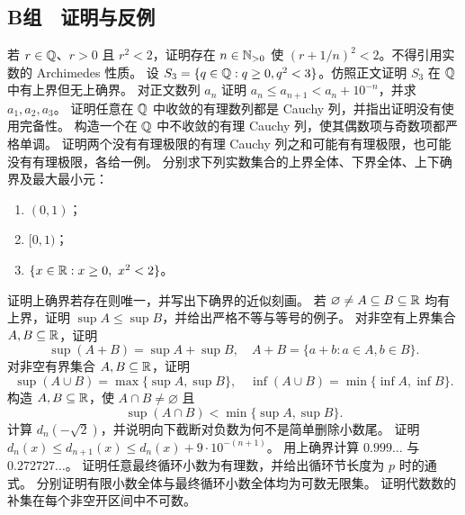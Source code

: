 \subsection*{B组　证明与反例}
\begin{enumerate}[label=\textbf{\thechapter.\arabic*.},resume]
  若 \(r\in\mathbb{Q}\)、\(r>0\) 且 \(r^2<2\)，证明存在 \(n\in\mathbb{N}_{>0}\) 使 \((r+1/n)^2<2\)。不得引用实数的 Archimedes 性质。
  设 \(S_3=\{q\in\mathbb{Q}:q\ge0,q^2<3\}\)。仿照正文证明 \(S_3\) 在 \(\mathbb{Q}\) 中有上界但无上确界。
  对正文数列 \(a_n\) 证明 \(a_n\le a_{n+1}<a_n+10^{-n}\)，并求 \(a_1,a_2,a_3\)。
  证明任意在 \(\mathbb{Q}\) 中收敛的有理数列都是 Cauchy 列，并指出证明没有使用完备性。
  构造一个在 \(\mathbb{Q}\) 中不收敛的有理 Cauchy 列，使其偶数项与奇数项都严格单调。
  证明两个没有有理极限的有理 Cauchy 列之和可能有有理极限，也可能没有有理极限，各给一例。
  分别求下列实数集合的上界全体、下界全体、上下确界及最大最小元：
 \begin{enumerate}[label=(\arabic*)]
  \item \((0,1)\)；
  \item \([0,1)\)；
  \item \(\{x\in\R:x\ge0,\ x^2<2\}\)。
 \end{enumerate}
  证明上确界若存在则唯一，并写出下确界的近似刻画。
  若 \(\varnothing\ne A\subseteq B\subseteq\mathbb{R}\) 均有上界，证明 \(\sup A\le\sup B\)，并给出严格不等与等号的例子。
  对非空有上界集合 \(A,B\subseteq\mathbb{R}\)，证明
 \[
 \sup(A+B)=\sup A+\sup B,
 \quad A+B=\{a+b:a\in A,b\in B\}.
 \]
  对非空有界集合 \(A,B\subseteq\mathbb{R}\)，证明
 \[
 \sup(A\cup B)=\max\{\sup A,\sup B\},\quad
 \inf(A\cup B)=\min\{\inf A,\inf B\}.
 \]
  构造 \(A,B\subseteq\mathbb{R}\)，使 \(A\cap B\ne\varnothing\) 且
 \[
 \sup(A\cap B)<\min\{\sup A,\sup B\}.
 \]
  计算 \(d_n(-\sqrt2)\)，并说明向下截断对负数为何不是简单删除小数尾。
  证明 \(d_n(x)\le d_{n+1}(x)\le d_n(x)+9\cdot10^{-(n+1)}\)。
  用上确界计算 \(0.999\ldots\) 与 \(0.272727\ldots\)。
  证明任意最终循环小数为有理数，并给出循环节长度为 \(p\) 时的通式。
 分别证明有限小数全体与最终循环小数全体均为可数无限集。
  证明代数数的补集在每个非空开区间中不可数。
\end{enumerate}

